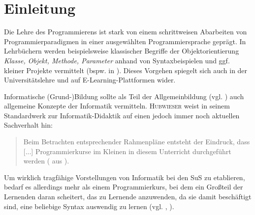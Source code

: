 \documentclass[paper=a4, DIV=13, BCOR=12mm, twoside=on, onecolumn=on, open = any, titlepage =on, parskip =half-, headsepline = on, footsepline = on, chapterprefix = on, sectionprefix = on, appendixprefix = off, fontsize = 12pt, numbers = noenddot, abstract = off]{scrreprt}
\begin{document}
\newpage
\thispagestyle{plain}




\thispagestyle{empty}
\newpage
\thispagestyle{empty}

%
%
{}
\newcommand{\hsp}{\hspace{20pt}}
\titleformat{\chapter}[hang]{\Large\bfseries}{\thechapter\hsp\textcolor{gray75}{|}\hsp}{0pt}{\Large\bfseries}

\tableofcontents
\cleardoublepage
{}
\par \singlespacing
\renewcommand*{\dictumwidth}{.6667\textwidth}
\chapter{Einleitung}
\label{sec:einleitung}
\onehalfspacing
\vspace*{-1cm}

Die Lehre des Programmierens ist stark von einem schrittweisen Abarbeiten von Programmierparadigmen in einer ausgewählten Programmiersprache geprägt. In Lehrbüchern werden beispielsweise klassischer Begriffe der Objektorientierung \emph{Klasse, Objekt, Methode, Parameter} anhand von Syntaxbeispielen und ggf. kleiner Projekte vermittelt (bspw. in \cite{abts:15} \cite{barnes:03} \cite{ehmann:09} \cite{ullenboom:12}). Dieses Vorgehen spiegelt sich auch in der Universitätslehre und auf E-Learning-Plattformen wider. 

Informatische (Grund-)Bildung sollte als Teil der Allgemeinbildung (vgl. \cite{breier:94}) auch allgemeine Konzepte der Informatik vermitteln. \textsc{Hubwieser} weist in seinem Standardwerk zur Informatik-Didaktik auf einen jedoch immer noch aktuellen Sachverhalt hin:
\begin{quote}
\small
Beim Betrachten entsprechender Rahmenpläne entsteht der Eindruck, dass [...] Programmierkurse im Kleinen in diesem Unterricht durchgeführt werden (\cite[S.40]{hubwieser:07} aus \cite{koerber:93}).
\end{quote}
\normalsize
Um wirklich tragfähige Vorstellungen von Informatik bei den SuS zu etablieren, bedarf es allerdings mehr als einem Programmierkurs, bei dem ein Großteil der Lernenden daran scheitert, das zu Lernende anzuwenden, da sie damit beschäftigt sind, eine beliebige Syntax auswendig zu lernen (vgl. \cite{humbert:02}, \cite{modrow:11}).
\end{document}
